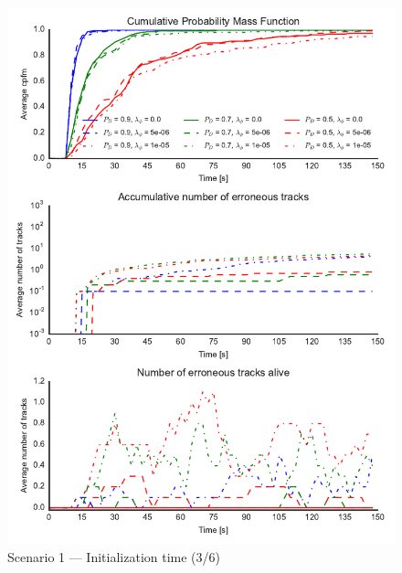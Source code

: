 \begin{figure}
\centering
\includegraphics{Figures/plots/Scenario1_Init-Time(3-6).pdf}
\caption{Scenario 1 --- Initialization time (3/6)}\label{fig:init1_time_3-6}
\end{figure}
